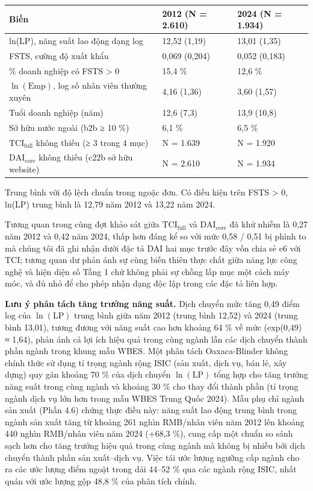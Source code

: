 \documentclass[12pt,a4paper]{article}
\begin{document}
\begin{longtable}[]{@{}lll@{}}
\toprule\noalign{}
Biến & 2012 (N = 2.610) & 2024 (N = 1.934) \\
\midrule\noalign{}
\endhead
\bottomrule\noalign{}
\endlastfoot
ln(LP), năng suất lao động dạng log & 12,52 (1,19) & 13,01 (1,35) \\
FSTS, cường độ xuất khẩu & 0,069 (0,204) & 0,052 (0,183) \\
\% doanh nghiệp có FSTS \textgreater{} 0 & 15,4 \% & 12,6 \% \\
\(\ln(\mathrm{Emp})\), log số nhân viên thường xuyên & 4,16 (1,36) &
3,60 (1,57) \\
Tuổi doanh nghiệp (năm) & 12,6 (7,3) & 13,9 (10,8) \\
Sở hữu nước ngoài (b2b ≥ 10 \%) & 6,1 \% & 6,5 \% \\
\(\mathrm{TCI}_{\text{full}}\) không thiếu (≥ 3 trong 4 mục) & N = 1.639
& N = 1.920 \\
\(\mathrm{DAI}_{\text{core}}\) không thiếu (c22b sở hữu website) & N =
2.610 & N = 1.934 \\
\end{longtable}

Trung bình với độ lệch chuẩn trong ngoặc đơn. Có điều kiện trên FSTS
\textgreater{} 0, ln(LP) trung bình là 12,79 năm 2012 và 13,22 năm 2024.

Tương quan trong cùng đợt khảo sát giữa \(\mathrm{TCI}_{\text{full}}\)
và \(\mathrm{DAI}_{\text{core}}\) đã khử nhiễm là 0,27 năm 2012 và 0,42
năm 2024, thấp hơn đáng kể so với mức 0,58 / 0,51 bị phình to mà chúng
tôi đã ghi nhận dưới đặc tả DAI hai mục trước đây vốn chia sẻ e6 với
TCI; tương quan dư phản ánh sự cùng biến thiên thực chất giữa năng lực
công nghệ và hiện diện số Tầng 1 chứ không phải sự chồng lấp mục một
cách máy móc, và đủ nhỏ để cho phép nhận dạng độc lập trong các đặc tả
liên hợp.

\textbf{Lưu ý phân tách tăng trưởng năng suất.} Dịch chuyển mức tăng
0,49 điểm log của \(\ln(\mathrm{LP})\) trung bình giữa năm 2012 (trung
bình 12,52) và 2024 (trung bình 13,01), tương đương với năng suất cao
hơn khoảng 64 \% về mức (exp(0,49) ≈ 1,64), phản ánh cả lợi ích hiệu quả
trong cùng ngành lẫn các dịch chuyển thành phần ngành trong khung mẫu
WBES. Một phân tách Oaxaca-Blinder không chính thức sử dụng tỉ trọng
ngành rộng ISIC (sản xuất, dịch vụ, bán lẻ, xây dựng) quy gán khoảng 70
\% của dịch chuyển \(\ln(\mathrm{LP})\) tổng hợp cho tăng trưởng năng
suất trong cùng ngành và khoảng 30 \% cho thay đổi thành phần (tỉ trọng
ngành dịch vụ lớn hơn trong mẫu WBES Trung Quốc 2024). Mẫu phụ chỉ ngành
sản xuất (Phần 4.6) chứng thực điều này: năng suất lao động trung bình
trong ngành sản xuất tăng từ khoảng 261 nghìn RMB/nhân viên năm 2012 lên
khoảng 440 nghìn RMB/nhân viên năm 2024 (+68,3 \%), cung cấp một chuẩn
so sánh sạch hơn cho tăng trưởng hiệu quả trong cùng ngành mà không bị
nhiễu bởi dịch chuyển thành phần sản xuất--dịch vụ. Việc tái ước lượng
ngưỡng cấp ngành cho ra các ước lượng điểm ngoặt trong dải 44--52 \% qua
các ngành rộng ISIC, nhất quán với ước lượng gộp 48,8 \% của phân tích
chính.
\end{document}
